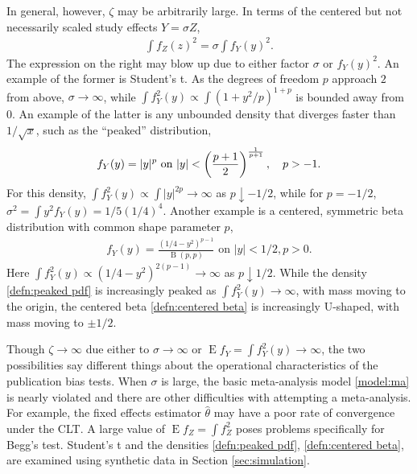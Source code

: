 \documentclass[12pt]{article}
\newcommand{\z}{Z}
\newcommand{\y}{Y}
\newcommand{\zdiff}{\zeta}
\DeclareMathOperator{\E}{E}
\DeclareMathOperator{\B}{B}
\newcommand{\comment}[1]{
  \iftoggle{commenttoggle}{
    {\normalsize{\color{red}{ #1}}\normalsize}
  }
  {}
}
\begin{document}
In general, however, $\zdiff$ may be arbitrarily
large. In terms of the centered but not necessarily scaled study effects $\y=\sigma\z$,
\begin{align}
  \int f_\z(z)^2 = \sigma\int f_\y(y)^2.
\end{align}
The expression on the right may blow up due to either factor $\sigma$
or $f_\y(y)^2$. An example of the former is Student's t. As the
degrees of freedom $p$ approach $2$ from above, $\sigma\to\infty$,
while $\int f_\y^2(y)\propto \int (1+y^2/p)^{1+p}$ is bounded away
from $0$. An example of the latter is any unbounded density that
diverges faster than $1/\sqrt{x}$, such as the ``peaked''
distribution,
\begin{align}
f_\y(y)=|y|^p \text{ on }|y|<\left(\frac{p+1}{2}\right)^{\frac{1}{p+1}}, \hspace{10px}p>-1. 
\label{defn:peaked pdf}
\end{align}
For this density, $\int f^2_\y(y) \propto \int |y|^{2p}\to\infty$ as
$p \downarrow -1/2$, while  for $p=-1/2$,
$\sigma^2=\int y^2 f_\y(y)=1/5(1/4)^4$.\comment{check} Another example is a centered, symmetric beta distribution with common shape parameter $p$,
\begin{align}
  f_\y(y)=\frac{\left(1/4-y^2\right)^{p-1}}{\B(p,p)}\text{ on }|y|<1/2, p>0.
  \label{defn:centered beta}
\end{align}
Here $\int f_\y^2(y) \propto (1/4-y^2)^{2(p-1)} \to \infty$ as
$p \downarrow 1/2$. While the density \eqref{defn:peaked
  pdf} is increasingly peaked as $\int f_\y^2(y)\to\infty$, with mass
moving to the origin, the centered beta \eqref{defn:centered beta} is
increasingly U-shaped, with mass moving to $\pm 1/2$.

Though $\zdiff\to\infty$ due either to $\sigma\to\infty$ or
$\E f_\y=\int f_\y^2(y)\to\infty$, the two possibilities say different things
about the operational characteristics of the publication bias
tests. When $\sigma$ is large, the basic meta-analysis model
\eqref{model:ma} is nearly violated and there are other difficulties
with attempting a meta-analysis. For example, the fixed effects
estimator $\hat\theta$ may have a poor rate of convergence under the
CLT. A large value of $\E f_Z=\int f_\z^2$ poses problems specifically
for Begg's test. Student's t and the densities \eqref{defn:peaked
  pdf}, \eqref{defn:centered beta}, are examined using synthetic data in Section
\ref{sec:simulation}.
\end{document}

